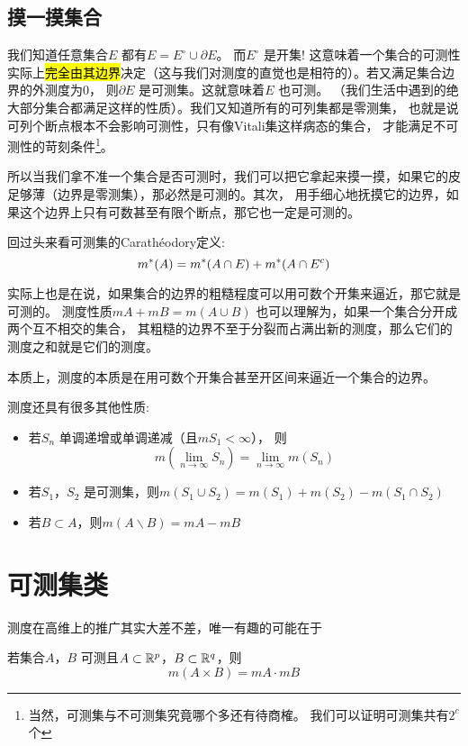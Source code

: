 \subsection{摸一摸集合}
我们知道任意集合\(E\) 都有\(E=E^{\circ} \cup \partial E\)。
而\(E^{\circ}\) 是开集!
这意味着一个集合的可测性实际上\hl{完全由其边界}决定（这与我们对测度的直觉也是相符的）。若又满足集合边界的外测度为0，
则\(\partial E\) 是可测集。这就意味着\(E\) 也可测。
（我们生活中遇到的绝大部分集合都满足这样的性质）。我们又知道所有的可列集都是零测集，
也就是说可列个断点根本不会影响可测性，只有像Vitali集这样病态的集合，
才能满足不可测性的苛刻条件\footnote{当然，可测集与不可测集究竟哪个多还有待商榷。
我们可以证明可测集共有\(2^{c}\) 个}。

所以当我们拿不准一个集合是否可测时，我们可以把它拿起来摸一摸，如果它的皮足够薄（边界是零测集），那必然是可测的。其次，
用手细心地抚摸它的边界，如果这个边界上只有可数甚至有限个断点，那它也一定是可测的。

回过头来看可测集的Carathéodory定义: \[
    m^{*}(A)=m^{*}(A\cap E)+m^{*}(A\cap E^{c})
\]

实际上也是在说，如果集合的边界的粗糙程度可以用可数个开集来逼近，那它就是可测的。
测度性质\(mA+mB=m(A\cup B)\) 也可以理解为，如果一个集合分开成两个互不相交的集合，
其粗糙的边界不至于分裂而占满出新的测度，那么它们的测度之和就是它们的测度。

本质上，测度的本质是在用可数个开集合甚至开区间来逼近一个集合的边界。

测度还具有很多其他性质:
\begin{itemize}
    \item 若\({S_{n}}\) 单调递增或单调递减（且\(mS_{1}<\infty\)），
        则\[m(\lim_{n \to \infty} S_{n})=\lim_{n\to
        \infty} m(S_{n})\]
    \item 若\(S_{1}\)，\(S_{2}\) 是可测集，则\(
        m(S_{1}\cup S_{2})=m(S_{1})+m(S_{2})-m(S_{1}\cap S_{2})\)
    \item 若\(B \subset A\)，则\(m(A \backslash B)=mA-mB\)
\end{itemize}
\section{可测集类}

测度在高维上的推广其实大差不差，唯一有趣的可能在于

\begin{theorem}
    若集合\(A\)，\(B\) 可测且\(A\subset \mathbb{R}^{p}\)，\(B \subset \mathbb{R}^{q} \)，则\[
        m(A\times B)=mA \cdot mB
    \]
\end{theorem}

